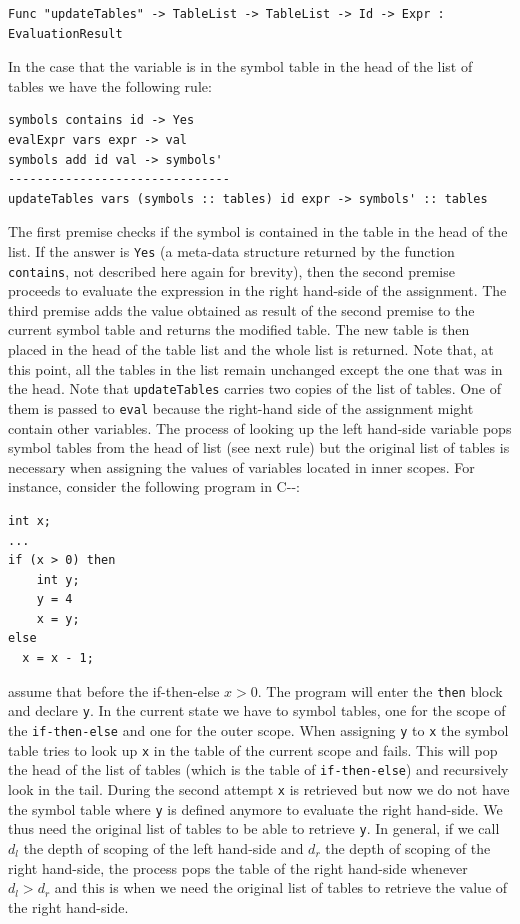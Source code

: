 \begin{lstlisting}
Func "updateTables" -> TableList -> TableList -> Id -> Expr : EvaluationResult
\end{lstlisting}

\noindent
In the case that the variable is in the symbol table in the head of the list of tables we have the following rule:

\begin{lstlisting}
symbols contains id -> Yes
evalExpr vars expr -> val
symbols add id val -> symbols'
-------------------------------
updateTables vars (symbols :: tables) id expr -> symbols' :: tables
\end{lstlisting}

\noindent
The first premise checks if the symbol is contained in the table in the head of the list. If the answer is \texttt{Yes} (a meta-data structure returned by the function \texttt{contains}, not described here again for brevity), then the second premise proceeds to evaluate the expression in the right hand-side of the assignment. The third premise adds the value obtained as result of the second premise to the current symbol table and returns the modified table. The new table is then placed in the head of the table list and the whole list is returned. Note that, at this point, all the tables in the list remain unchanged except the one that was in the head. Note that \texttt{updateTables} carries two copies of the list of tables. One of them is passed to \texttt{eval} because the right-hand side of the assignment might contain other variables. The process of looking up the left hand-side variable pops symbol tables from the head of list (see next rule) but the original list of tables is necessary when assigning the values of variables located in inner scopes. For instance, consider the following program in C-{}-:

\begin{lstlisting}[caption = C-{}- sample program, label = code:ch_mcnv_languages_c--_sample_program]
int x;
...
if (x > 0) then
	int y;
	y = 4
	x = y;
else
  x = x - 1;	
\end{lstlisting}

\noindent
assume that before the if-then-else $x > 0$. The program will enter the \texttt{then} block and declare \texttt{y}. In the current state we have to symbol tables, one for the scope of the \texttt{if-then-else} and one for the outer scope. When assigning \texttt{y} to \texttt{x} the symbol table tries to look up \texttt{x} in the table of the current scope and fails. This will pop the head of the list of tables (which is the table of \texttt{if-then-else}) and recursively look in the tail. During the second attempt \texttt{x} is retrieved but now we do not have the symbol table where \texttt{y} is defined anymore to evaluate the right hand-side. We thus need the original list of tables to be able to retrieve \texttt{y}. In general, if we call \texttt{$d_l$} the depth of scoping of the left hand-side and $d_r$ the depth of scoping of the right hand-side, the process pops the table of the right hand-side whenever $d_l > d_r$ and this is when we need the original list of tables to retrieve the value of the right hand-side.

